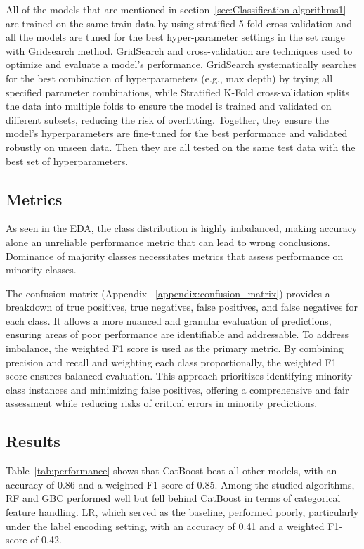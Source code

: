\documentclass{article}
\begin{document}
All of the models that are mentioned in section~\ref{sec:Classification algorithms1} are trained on the same train data by using stratified 5-fold cross-validation and all the models are tuned for the best hyper-parameter settings in the set range with Gridsearch method. GridSearch and cross-validation are techniques used to optimize and evaluate a model's performance. GridSearch systematically searches for the best combination of hyperparameters (e.g., max depth) by trying all specified parameter combinations, while Stratified K-Fold cross-validation splits the data into multiple folds to ensure the model is trained and validated on different subsets, reducing the risk of overfitting. Together, they ensure the model's hyperparameters are fine-tuned for the best performance and validated robustly on unseen data. Then they are all tested on the same test data with the best set of hyperparameters.

\subsection{Metrics} \label{sec:Metrics1}

As seen in the EDA, the class distribution is highly imbalanced, making accuracy alone an unreliable performance metric that can lead to wrong conclusions. Dominance of majority classes necessitates metrics that assess performance on minority classes. 

The confusion matrix (Appendix ~\ref{appendix:confusion_matrix}) provides a breakdown of true positives, true negatives, false positives, and false negatives for each class. It allows a more nuanced and granular evaluation of predictions, ensuring areas of poor performance are identifiable and addressable. To address imbalance, the weighted F1 score is used as the primary metric. By combining precision and recall and weighting each class proportionally, the weighted F1 score ensures balanced evaluation. This approach prioritizes identifying minority class instances and minimizing false positives, offering a comprehensive and fair assessment while reducing risks of critical errors in minority predictions.

\subsection{Results}

Table~\ref{tab:performance} shows that CatBoost beat all other models, with an accuracy of 0.86 and a weighted F1-score of 0.85. Among the studied algorithms, RF and GBC performed well but fell behind CatBoost in terms of categorical feature handling. LR, which served as the baseline, performed poorly, particularly under the label encoding setting, with an accuracy of 0.41 and a weighted F1-score of 0.42.
\end{document}
